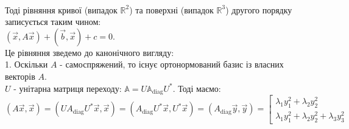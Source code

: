 \bigskip \\
Тоді рівняння кривої (випадок $\mathbb{R}^2$) та поверхні (випадок $\mathbb{R}^3$) другого порядку записується таким чином:\\
$(\vec{x}, A \vec{x}) + (\vec{b}, \vec{x}) + c = 0$.\\
Це рівняння зведемо до канонічного вигляду:\\
1. Оскільки $A$ - самоспряжений, то існує ортонормований базис із власних векторів $A$.\\
$U$ - унітарна матриця переходу: $\mathbb{A} = U \mathbb{A}_{\textrm{diag}} U^*$. Тоді маємо:\\
$(A\vec{x}, \vec{x}) = (U A_{\textrm{diag}} U^* \vec{x}, \vec{x}) = (A_{\textrm{diag}} U^* \vec{x}, U^* \vec{x}) = (A_{\textrm{diag}}\vec{y}, \vec{y}) = \left[ \begin{gathered} \lambda_1 y_1^2 + \lambda_2 y_2^2 \\
\lambda_1 y_1^2 + \lambda_2 y_2^2 + \lambda_3 y_3^2
 \end{gathered} \right.$

